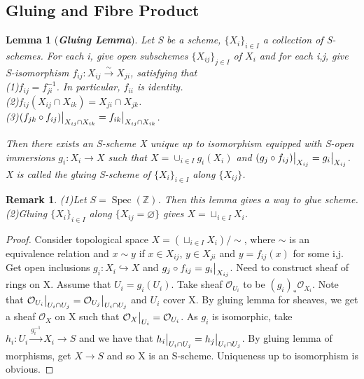 \documentclass{ctexart}
\newtheorem{remark}{Remark}[section]
\newtheorem{lemma}{Lemma}[section]
\newcommand{\spec}{\operatorname{Spec}}
\begin{document}
\subsection{Gluing and Fibre Product}
\begin{lemma}[\textbf{\emph{Gluing Lemma}}]
    Let S be a scheme, $\{X_{i}\}_{i\in I}$ a collection of S-schemes.
    For each i, give open subschemes $\{X_{ij}\}_{j\in I}$ of $X_{i}$ and for each i,j, give S-isomorphism $f_{ij}: X_{ij} \overset{\sim}{\longrightarrow} X_{ji}$,
    satisfying that \\
    (1)$f_{ij} = f_{ji}^{-1}$. 
    In particular, $f_{ii}$ is identity. \\
    (2)$f_{ij}(X_{ij} \cap X_{ik}) = X_{ji} \cap X_{jk}$. \\
    (3)$(f_{jk} \circ f_{ij})\big{|}_{X_{ij} \cap X_{ik}} = f_{ik}\big{|}_{X_{ij} \cap X_{ik}}$.
    \par
    Then there exists an S-scheme X unique up to isomorphism equipped with S-open immersions $g_{i}: X_{i} \longrightarrow X$ such that $X = \cup_{i\in I} g_{i}(X_{i})$ and $(g_{j} \circ f_{ij})\big{|}_{X_{ij}} = g_{i}\big{|}_{X_{ij}}$.
    X is called the gluing S-scheme of $\{X_{i}\}_{i\in I}$ along $\{X_{ij}\}$.
    \label{Lemma 2.12}
\end{lemma}
\begin{remark}
    (1)Let $S = \spec(\mathbb{Z})$.
    Then this lemma gives a way to glue scheme. \\
    (2)Gluing $\{X_{i}\}_{i\in I}$ along $\{X_{ij} = \varnothing\}$ gives $X = \sqcup_{i\in I} X_{i}$.
\end{remark}
\begin{proof}
    Consider topological space $X = (\sqcup_{i\in I} X_{i})/\sim$, 
    where $\sim$ is an equivalence relation and $x \sim y$ if $x\in X_{ij}$, $y\in X_{ji}$ and $y = f_{ij}(x)$ for some i,j.
    Get open inclusions $g_{i}: X_{i} \hookrightarrow X$ and $g_{j} \circ f_{ij} = g_{i}\big{|}_{X_{ij}}$.
    Need to construct sheaf of rings on X.
    Assume that $U_{i} = g_{i}(U_{i})$.
    Take sheaf $\mathcal{O}_{U_{i}}$ to be $(g_{i})_{\ast}\mathcal{O}_{X_{i}}$.
    Note that $\mathcal{O}_{U_{i}}\big{|}_{U_{i} \cap U_{j}} = \mathcal{O}_{U_{j}}\big{|}_{U_{i} \cap U_{j}}$ and $U_{i}$ cover X.
    By gluing lemma for sheaves, we get a sheaf $\mathcal{O}_{X}$ on X such that $\mathcal{O}_{X}\big{|}_{U_{i}} = \mathcal{O}_{U_{i}}$.
    As $g_{i}$ is isomorphic, take $h_{i}: U_{i} \overset{g_{i}^{-1}}{\longrightarrow} X_{i} \longrightarrow S$ and we have that $h_{i}\big{|}_{U_{i} \cap U_{j}} = h_{j}\big{|}_{U_{i} \cap U_{j}}$.
    By gluing lemma of morphisms, get $X \longrightarrow S$ and so X is an S-scheme.
    Uniqueness up to isomorphism is obvious.
\end{proof}
\end{document}
